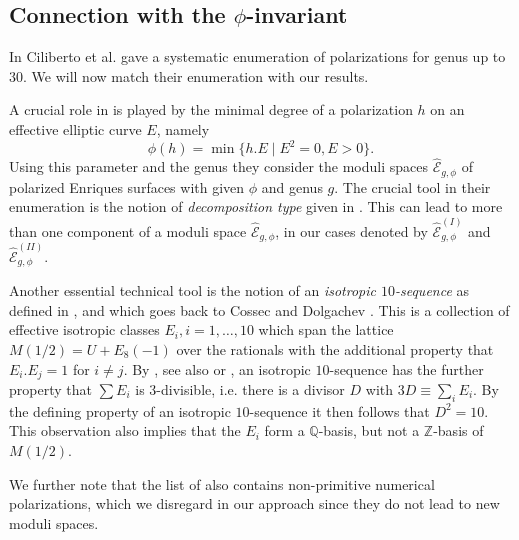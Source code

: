 \documentclass[a4paper,11pt]{article}
\newcommand{\QQ}{\mathbb Q}
\newcommand{\ZZ}{\mathbb Z}
\newcommand{\cE}{\mathcal E}
\begin{document}
\newpage

\subsection{Connection with the $\phi$-invariant} \label{subsec:phi}
In  \cite[Appendix]{CDGK} Ciliberto et al. gave a systematic enumeration of polarizations for genus up to $30$. We will now match their enumeration with our results.

A crucial role in \cite{CDGK} is played by the minimal degree of a polarization $h$
on an effective elliptic curve $E$, namely
\begin{equation*}
\phi (h) = \min \{h.E \mid E^2=0, E >0 \}.
\end{equation*}
Using this parameter and the genus they consider the moduli spaces  $\widehat{\cE}_{g,\phi}$ of polarized Enriques surfaces with given $\phi$ and genus $g$.
The crucial tool in their enumeration is the notion of {\em decomposition type} given in \cite[Definition 4.13]{CDGK}. This can lead to more than one component of
a moduli space $\widehat{\cE}_{g,\phi}$, in our cases denoted by $\widehat{\cE}^{(I)}_{g,\phi}$ and $\widehat{\cE}^{(II)}_{g,\phi}$.

Another essential technical tool is the notion of an {\em isotropic $10$-sequence} as defined in \cite[Definition 3.2]{CDGK}, and which goes back
to  Cossec and Dolgachev \cite[p. 122]{CD}.
This is a collection of effective isotropic classes $E_i, i=1, \ldots ,10$ which span the lattice $M(1/2)=U+E_8(-1)$ over the rationals with the
additional property that $E_i.E_j=1$ for $i \neq j$.
By  \cite[Lemma 3.4]{CDGK}, see also \cite[Lemma 1.6.2 (i)]{Cos} or \cite[Corollary 2.5.5]{CD}, an isotropic $10$-sequence has the further property that $\sum E_i$ is $3$-divisible, i.e. there is a divisor $D$
with $3D \equiv \sum_i E_i$.
By the defining property of an isotropic $10$-sequence it then follows that $D^2=10$. This observation also implies that the $E_i$
form a $\QQ$-basis, but not a $\ZZ$-basis of $M(1/2)$.

We further note that the list of \cite[Appendix]{CDGK} also contains non-primitive numerical polarizations, which we disregard in our approach since they do not lead to new moduli spaces.
\end{document}
